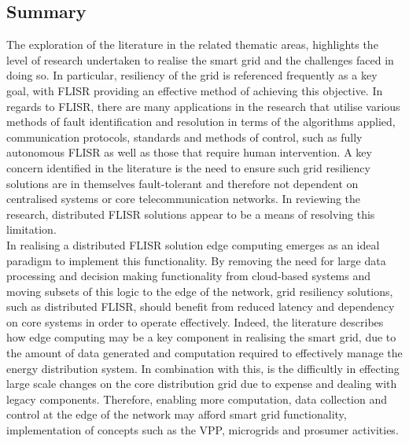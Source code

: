 \subsection{Summary}
\label{sec:summary}

The exploration of the literature in the related thematic areas, highlights the level of research undertaken to realise the smart grid and the challenges faced in doing so. In particular,
resiliency of the grid is referenced frequently as a key goal, with FLISR providing an effective method of achieving this objective. In regards to FLISR, there are many applications in the research
that utilise various methods of fault identification and resolution in terms of the algorithms applied, communication protocols, standards and methods of control, such as fully autonomous
FLISR as well as those that require human intervention. A key concern identified in the literature is the need to ensure such grid resiliency solutions are in themselves fault-tolerant and therefore not dependent on centralised
systems or core telecommunication networks. In reviewing the research, distributed FLISR solutions appear to be a means of resolving this limitation.
\\
In realising a distributed FLISR solution edge computing emerges as an ideal paradigm to implement this functionality.
By removing the need for large data processing and decision making functionality from cloud-based systems and moving subsets of this logic to the edge of the network, grid resiliency solutions,
such as distributed FLISR, should benefit from reduced latency and dependency on core systems in order to operate effectively.
Indeed, the literature describes how edge computing may be a key component in realising the smart grid, due to the amount of data generated and computation required to effectively manage the
energy distribution system. In combination with this, is the difficultly in effecting large scale changes on the core distribution grid due to expense and dealing with legacy components. Therefore, enabling
more computation, data collection and control at the edge of the network may afford smart grid functionality, implementation of concepts such as the VPP, microgrids and prosumer activities.

\clearpage
